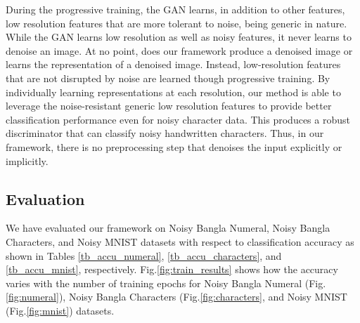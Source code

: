 \documentclass[runningheads]{llncs}
\begin{document}
 During the progressive training,  the GAN learns, in addition to other features,  low resolution features that are more tolerant to noise, being generic in nature. While the GAN learns low resolution as well as noisy features, it never learns to denoise an image. At no point,  does our framework produce  a denoised image or learns the representation of a denoised image.  Instead, low-resolution features that are not disrupted by noise are learned though progressive training.  By individually learning representations at each resolution, our method is able to leverage the noise-resistant generic  low resolution features to provide better  classification performance even for noisy character data. This produces a robust discriminator that can classify noisy  handwritten characters.  Thus, in our framework, there is no preprocessing step that denoises the input explicitly or implicitly. 

\begin{figure*}[p]
\centering
{}
\caption[Optional caption for list of figures]{The classification accuracy of our approach. Our approach has been evaluated on datasets of Noisy Bangla Numeral, Noisy Bangla Characters, and Noisy MNIST with three types of added noise, AWGN, Motion, Contrast.}
\label{fig:train_results}
\end{figure*}

\subsection{Evaluation}
We have evaluated our  framework on Noisy Bangla Numeral, Noisy Bangla Characters, and Noisy MNIST datasets with respect to classification accuracy as shown in Tables \ref{tb_accu_numeral}, \ref{tb_accu_characters}, and \ref{tb_accu_mnist}, respectively. Fig.\ref{fig:train_results} shows how the accuracy  varies with the number of training epochs for Noisy Bangla Numeral (Fig.\ref{fig:numeral}), Noisy Bangla Characters (Fig.\ref{fig:characters}, and Noisy MNIST (Fig.\ref{fig:mnist}) datasets. 
\end{document}
